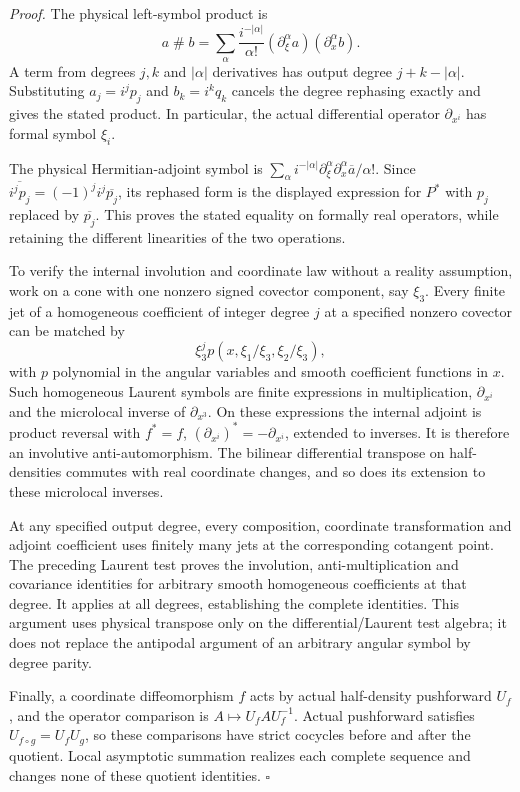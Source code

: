 \documentclass[
  english,
  11pt,
  reqno]{amsart}
\newcounter{none} %
\begin{document}
\emph{Proof.} The physical left-symbol product is \[
a\mathbin{\#}b=
\sum_\alpha\frac{i^{-|\alpha|}}{\alpha!}
(\partial_\xi^\alpha a)(\partial_x^\alpha b).
\] A term from degrees \(j,k\) and \(|\alpha|\) derivatives has output
degree \(j+k-|\alpha|\). Substituting \(a_j=i^jp_j\) and \(b_k=i^kq_k\)
cancels the degree rephasing exactly and gives the stated product. In
particular, the actual differential operator \(\partial_{x^i}\) has
formal symbol \(\xi_i\).

The physical Hermitian-adjoint symbol is
\(\sum_\alpha i^{-|\alpha|}\partial_\xi^\alpha\partial_x^\alpha\overline a/\alpha!\).
Since \(\overline{i^jp_j}=(-1)^ji^j\overline{p_j}\), its rephased form
is the displayed expression for \(P^*\) with \(p_j\) replaced by
\(\overline{p_j}\). This proves the stated equality on formally real
operators, while retaining the different linearities of the two
operations.

To verify the internal involution and coordinate law without a reality
assumption, work on a cone with one nonzero signed covector component,
say \(\xi_3\). Every finite jet of a homogeneous coefficient of integer
degree \(j\) at a specified nonzero covector can be matched by \[
\xi_3^j p(x,\xi_1/\xi_3,\xi_2/\xi_3),
\] with \(p\) polynomial in the angular variables and smooth coefficient
functions in \(x\). Such homogeneous Laurent symbols are finite
expressions in multiplication, \(\partial_{x^i}\) and the microlocal
inverse of \(\partial_{x^3}\). On these expressions the internal adjoint
is product reversal with \(f^*=f\),
\((\partial_{x^i})^*=-\partial_{x^i}\), extended to inverses. It is
therefore an involutive anti-automorphism. The bilinear differential
transpose on half-densities commutes with real coordinate changes, and
so does its extension to these microlocal inverses.

At any specified output degree, every composition, coordinate
transformation and adjoint coefficient uses finitely many jets at the
corresponding cotangent point. The preceding Laurent test proves the
involution, anti-multiplication and covariance identities for arbitrary
smooth homogeneous coefficients at that degree. It applies at all
degrees, establishing the complete identities. This argument uses
physical transpose only on the differential/Laurent test algebra; it
does not replace the antipodal argument of an arbitrary angular symbol
by degree parity.

Finally, a coordinate diffeomorphism \(f\) acts by actual half-density
pushforward \(U_f\), and the operator comparison is
\(A\mapsto U_fAU_f^{-1}\). Actual pushforward satisfies
\(U_{f\circ g}=U_fU_g\), so these comparisons have strict cocycles
before and after the quotient. Local asymptotic summation realizes each
complete sequence and changes none of these quotient identities.
\hfill\(\square\)
\end{document}
